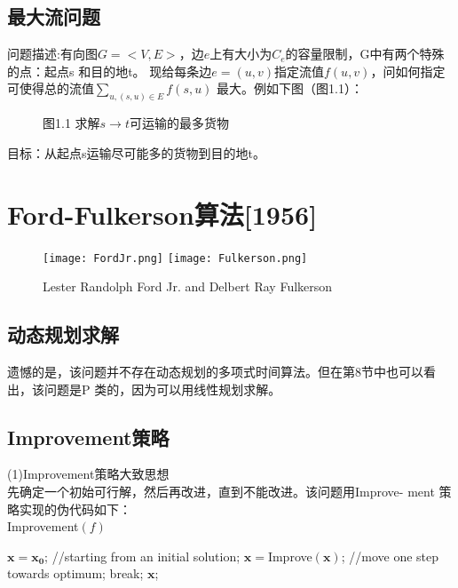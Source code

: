 \subsection{最大流问题}
问题描述:有向图$G=<V,E>$，边$e$上有大小为$C_e$的容量限制，G中有两个特殊的点：起点s 和目的地t。 现给每条边$e=(u,v)$指定流值$f(u,v)$，问如何指定可使得总的流值$\sum_{u, (s,u)\in E} f{(s,u)}$ 最大。例如下图（图1.1）：
\begin{figure}[H]
\center
{}
   \caption{图1.1 求解$s\rightarrow t$可运输的最多货物}
\end{figure}
目标：从起点s运输尽可能多的货物到目的地t。
\section{Ford-Fulkerson算法[1956]}
\begin{figure}[H]
   \center
      \texttt{[image: FordJr.png]}%
     \qquad
      \texttt{[image: Fulkerson.png]}%
   \caption{Lester Randolph Ford Jr. and Delbert Ray Fulkerson}
 \end{figure}
 \subsection{动态规划求解}
 遗憾的是，该问题并不存在动态规划的多项式时间算法。但在第8节中也可以看出，该问题是P 类的，因为可以用线性规划求解。
 \subsection{Improvement策略}
 (1)Improvement策略大致思想\\
 先确定一个初始可行解，然后再改进，直到不能改进。该问题用Improve-
 ment 策略实现的伪代码如下：\\
{\sc Improvement}$(f)$
 \begin{algorithmic}[1]
\STATE $\mathbf{x=x_0}$; //starting from an initial solution;
\STATE $\mathbf{x}=${\sc Improve}$(\mathbf{x})$; //move one step towards optimum;
\STATE break;
\ENDIF
\ENDWHILE
\RETURN $\mathbf{x}$;
\end{algorithmic}

